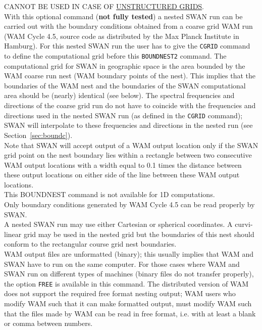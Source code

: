 \documentclass[12pt]{book}
\begin{document}
\noindent
CANNOT BE USED IN CASE OF \underline{UNSTRUCTURED GRIDS}.
\\[2ex]
\noindent
With this optional command ({\bf not fully tested}) a nested SWAN run can be carried out with the boundary
conditions obtained from a coarse grid WAM run (WAM Cycle 4.5, source code as distributed by the
Max Planck Institute in Hamburg). For this nested SWAN run the user has to give the {\tt CGRID} command
to define the computational grid before this {\tt BOUNDNEST2} command. The computational grid for SWAN
in geographic space is the area bounded by the WAM coarse run nest (WAM boundary points of the nest).
This implies that the boundaries of the WAM nest and the boundaries of the SWAN computational area
should be (nearly) identical (see below). The spectral frequencies and directions of the coarse grid run
do not have to coincide with the frequencies and directions used in the nested SWAN run (as defined in
the {\tt CGRID} command); SWAN will interpolate to these frequencies and directions in the nested run (see
Section~\ref{sec:boundc}).
\\[2ex]
\noindent
Note that SWAN will accept output of a WAM output location only if the SWAN grid point on the nest
boundary lies within a rectangle between two consecutive WAM output locations with a width equal to 0.1
times the distance between these output locations on either side of the line between these WAM output
locations.
\\[2ex]
\noindent
This BOUNDNEST command is not available for 1D computations.
\\[2ex]
\noindent
Only boundary conditions generated by WAM Cycle 4.5 can be read properly by SWAN.
\\[2ex]
\noindent
A nested SWAN run may use either Cartesian or spherical coordinates. A curvi-linear grid may be used
in the nested grid but the boundaries of this nest should conform to the rectangular course grid nest
boundaries.
\\[2ex]
\noindent
WAM output files are unformatted (binary); this usually implies that WAM and SWAN have to run on the
same computer. For those cases where WAM and SWAN run on different types of machines (binary files
do not transfer properly), the option {\tt FREE} is available in this command. The distributed version of WAM
does not support the required free format nesting output; WAM users who modify WAM such that it can
make formatted output, must modify WAM such that the files made by WAM can be read in free format, i.e.
with at least a blank or comma between numbers.
\end{document}
